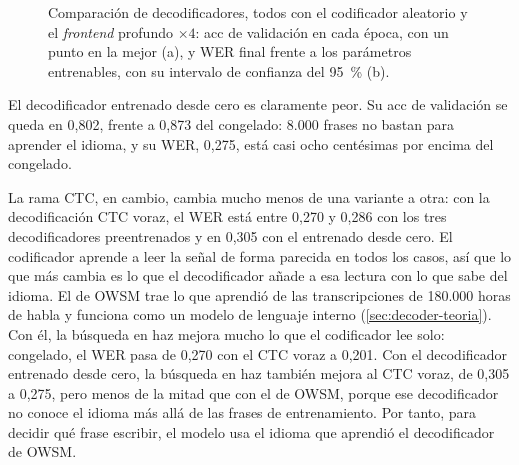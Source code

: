 
\begin{figure}[htbp]
  \centering
    \caption[Comparación de decodificadores]{Comparación de decodificadores, todos con el codificador aleatorio y el \textit{frontend} profundo $\times 4$: acc de validación en cada época, con un punto en la mejor (a), y WER final frente a los parámetros entrenables, con su intervalo de confianza del 95~\% (b).}
  \label{fig:res-decodificadores}
\end{figure}

El decodificador entrenado desde cero es claramente peor. Su acc de validación se queda en 0,802, frente a 0,873 del congelado: 8.000 frases no bastan para aprender el idioma, y su WER, 0,275, está casi ocho centésimas por encima del congelado.

La rama CTC, en cambio, cambia mucho menos de una variante a otra: con la decodificación CTC voraz, el WER está entre 0,270 y 0,286 con los tres decodificadores preentrenados y en 0,305 con el entrenado desde cero. El codificador aprende a leer la señal de forma parecida en todos los casos, así que lo que más cambia es lo que el decodificador añade a esa lectura con lo que sabe del idioma. El de OWSM trae lo que aprendió de las transcripciones de 180.000 horas de habla y funciona como un modelo de lenguaje interno (\cref{sec:decoder-teoria}). Con él, la búsqueda en haz mejora mucho lo que el codificador lee solo: congelado, el WER pasa de 0,270 con el CTC voraz a 0,201. Con el decodificador entrenado desde cero, la búsqueda en haz también mejora al CTC voraz, de 0,305 a 0,275, pero menos de la mitad que con el de OWSM, porque ese decodificador no conoce el idioma más allá de las frases de entrenamiento. Por tanto, para decidir qué frase escribir, el modelo usa el idioma que aprendió el decodificador de OWSM.

